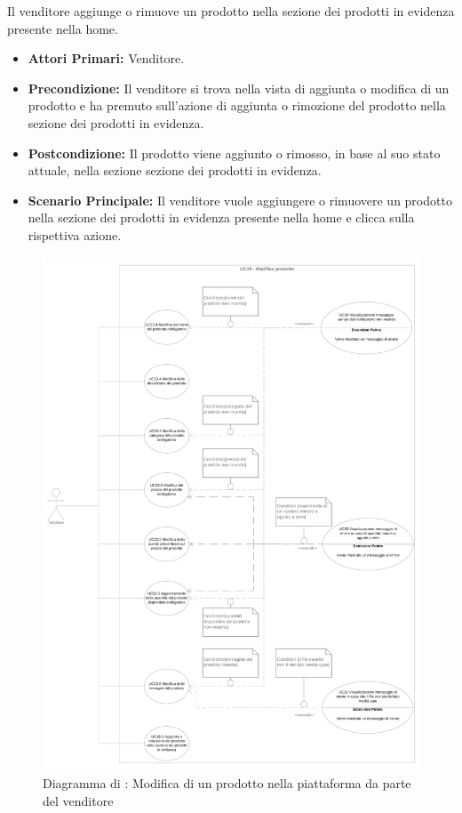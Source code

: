 \resetSubUC

Il venditore aggiunge o rimuove un prodotto nella sezione dei prodotti in evidenza presente nella home.
\begin{itemize}
    \item \textbf{Attori Primari:} Venditore.
    \item \textbf{Precondizione:} Il venditore si trova nella vista di aggiunta o modifica di un prodotto e ha premuto sull'azione di aggiunta o rimozione del prodotto nella sezione dei prodotti in evidenza.
    \item \textbf{Postcondizione:} Il prodotto viene aggiunto o rimosso, in base al suo stato attuale, nella sezione sezione dei prodotti in evidenza. 
    \item \textbf{Scenario Principale:} Il venditore vuole aggiungere o rimuovere un prodotto nella sezione dei prodotti in evidenza presente nella home e clicca sulla rispettiva azione.
\end{itemize}


\begin{figure}[H]
    \centering
    \includegraphics[scale=0.1]{Immagini/DiagrammiUC/UC19ModificaProdotto.png}
    \caption{Diagramma di \actualUC: Modifica di un prodotto nella piattaforma da parte del venditore}
    \label{fig:ModificaProdotto}
\end{figure}

